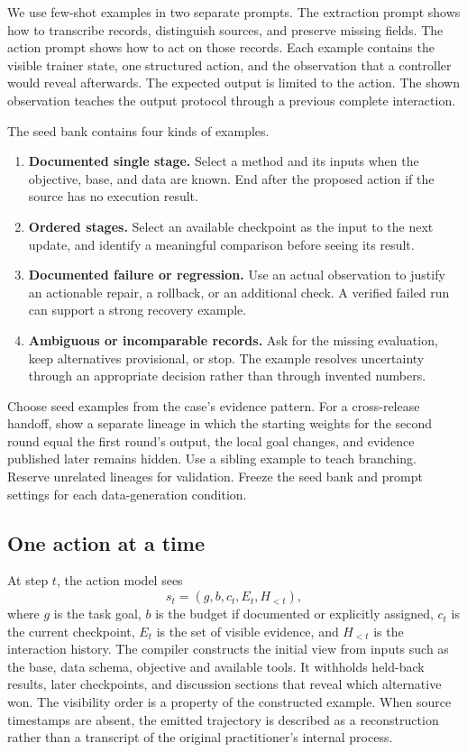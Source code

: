 \documentclass{article}
\begin{document}
We use few-shot examples in two separate prompts. The extraction prompt shows how to transcribe records, distinguish sources, and preserve missing fields. The action prompt shows how to act on those records. Each example contains the visible trainer state, one structured action, and the observation that a controller would reveal afterwards. The expected output is limited to the action. The shown observation teaches the output protocol through a previous complete interaction.

The seed bank contains four kinds of examples.

\begin{enumerate}
  \item \textbf{Documented single stage.} Select a method and its inputs when the objective, base, and data are known. End after the proposed action if the source has no execution result.
  \item \textbf{Ordered stages.} Select an available checkpoint as the input to the next update, and identify a meaningful comparison before seeing its result.
  \item \textbf{Documented failure or regression.} Use an actual observation to justify an actionable repair, a rollback, or an additional check. A verified failed run can support a strong recovery example.
  \item \textbf{Ambiguous or incomparable records.} Ask for the missing evaluation, keep alternatives provisional, or stop. The example resolves uncertainty through an appropriate decision rather than through invented numbers.
\end{enumerate}

Choose seed examples from the case's evidence pattern. For a cross-release handoff, show a separate lineage in which the starting weights for the second round equal the first round's output, the local goal changes, and evidence published later remains hidden. Use a sibling example to teach branching. Reserve unrelated lineages for validation. Freeze the seed bank and prompt settings for each data-generation condition.

\subsection{One action at a time}

At step \(t\), the action model sees
\begin{equation}
s_t = (g,b,c_t,E_t,H_{<t}),
\end{equation}
where \(g\) is the task goal, \(b\) is the budget if documented or explicitly assigned, \(c_t\) is the current checkpoint, \(E_t\) is the set of visible evidence, and \(H_{<t}\) is the interaction history. The compiler constructs the initial view from inputs such as the base, data schema, objective and available tools. It withholds held-back results, later checkpoints, and discussion sections that reveal which alternative won. The visibility order is a property of the constructed example. When source timestamps are absent, the emitted trajectory is described as a reconstruction rather than a transcript of the original practitioner's internal process.
\end{document}
